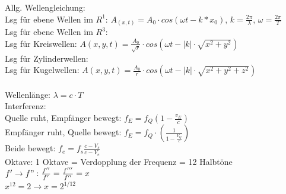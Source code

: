 \documentclass[A4]{scrreprt}
\begin{document}
  
  Allg. Wellengleichung:\\
  Lsg für ebene Wellen im $R^1$: $A_{(x,t)} = A_0\cdot cos(\omega t - k*x_0)$, $k = \frac{2\pi}{\lambda}$, $\omega = \frac{2\pi}{T}$\\
  Lsg für ebene Wellen im $R^3$: \\
  Lsg für Kreiswellen: $A(x,y,t) = \frac{A_0}{\sqrt{r}}\cdot cos(\omega t - |k|\cdot\sqrt{x^2+y^2})$\\
  Lsg für Zylinderwellen: \\
  Lsg für Kugelwellen: $A(x,y,t) = \frac{A_0}{r}\cdot cos(\omega t - |k|\cdot \sqrt{x^2+y^2+z^2})$\\
  \\
  Wellenlänge: $\lambda = c\cdot T$\\  

  Interferenz:\\

  Quelle ruht, Empfänger bewegt: $f_E = f_Q (1-\frac{v_E}{c})$\\
  Empfänger ruht, Quelle bewegt: $f_E = f_Q\cdot(\frac{1}{1-\frac{V_Q}{c}})$\\
  Beide bewegt: $f_e=f_s\frac{c-{V_s}}{c-{V_e}}$\\
  Oktave: 1 Oktave = Verdopplung der Frequenz = 12 Halbtöne\\
  $f' \rightarrow f": \frac{f''}{f'} = \frac{f'''}{f''} = x$\\
  $x^{12} = 2 \rightarrow x = 2^{1/12}$\\


\end{document}
